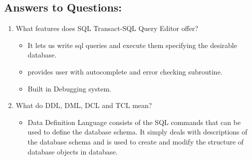 \documentclass[12pt]{article}
\begin{document}
        \subsection*{Answers to Questions:}
        \begin{enumerate}
                \item What features does SQL Transact-SQL Query Editor offer?
                \begin{itemize}
                        
                        \item It lets us write sql queries and execute them specifying the desirable database.
                        \item provides user with autocomplete and error checking subroutine.
                        \item Built in Debugging system.

                \end{itemize}
                
                \item What do DDL, DML, DCL and TCL mean?
                \begin{itemize}
                        \item  Data Definition Language consists of the SQL commands that can be used to define the database schema. It simply deals with descriptions of the database schema and is used to create and modify the structure of database objects in database.
                
                
                

\end{itemize}
\end{enumerate}
\end{document}
